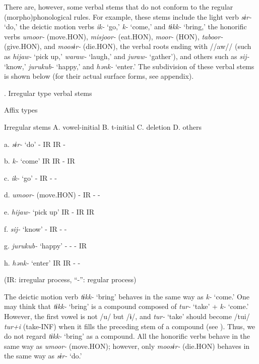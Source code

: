 There are, however, some verbal stems that do not conform to the regular (morpho)phonological rules. For example, these stems include the light verb \textit{sɨr-} ‘do,’ the deictic motion verbs \textit{ik-} ‘go,’ \textit{k-} ‘come,’ and \textit{tɨkk-} ‘bring,’ the honorific verbs \textit{umoor-} (move.HON), \textit{misjoor-} (eat.HON), \textit{moor-} (HON), \textit{taboor-} (give.HON), and \textit{moosɨr-} (die.HON), the verbal roots ending with //aw// (such as \textit{hijaw-} ‘pick up,’ \textit{waraw-} ‘laugh,’ and \textit{juraw-} ‘gather’), and others such as \textit{sij-} ‘know,’ \textit{jurukub-} ‘happy,’ and \textit{hənk-} ‘enter.’ The subdivision of these verbal stems is shown below (for their actual surface forms, see appendix).

\begin{styleBeschriftung}
\textmd{. Irregular type verbal stems}
\end{styleBeschriftung}

    Affix types

Irregular stems    A. vowel-initial  B. t-initial  C. deletion  D. others

a.  \textit{sɨr-} ‘do’    {}-  IR  IR  {}-

b.  \textit{k-} ‘come’    IR  IR  {}-  IR

c.  \textit{ik-} ‘go’    {}-  IR  {}-  {}-

d.  \textit{umoor-} (move.HON)    {}-  IR  {}-  {}-

e.  \textit{hijaw-} ‘pick up’    IR  {}-  IR  IR

f.  \textit{sij-} ‘know’    {}-  IR  {}-  {}-

g.  \textit{jurukub-} ‘happy’    {}-  {}-  {}-  IR

h.  \textit{hənk-} ‘enter’    IR  IR  {}-  {}-

(IR: irregular process, “-”: regular process)

The deictic motion verb \textit{tɨkk-} ‘bring’ behaves in the same way as \textit{k-} ‘come.’ One may think that \textit{tɨkk-} ‘bring’ is a compound composed of \textit{tur-} ‘take’ + \textit{k-} ‘come.’ However, the first vowel is not /u/ but /ɨ/, and \textit{tur-} ‘take’ should become /tui/ \textit{tur+i} (take-INF) when it fills the preceding stem of a compound (see ). Thus, we do not regard \textit{tɨkk-} ‘bring’ as a compound. All the honorific verbs behave in the same way as \textit{umoor-} (move.HON); however, only \textit{moosɨr-} (die.HON) behaves in the same way as \textit{sɨr-} ‘do.’

